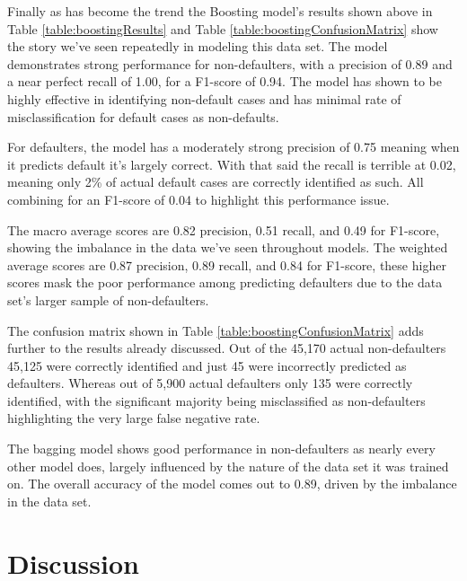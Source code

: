\documentclass[12pt]{article}
\begin{document}
Finally as has become the trend the Boosting model's results shown above in Table \ref{table:boostingResults} and Table \ref{table:boostingConfusionMatrix} show the story we've seen repeatedly in modeling this data set. The model demonstrates strong performance for non-defaulters, with a precision of 0.89 and a near perfect recall of 1.00, for a F1-score of 0.94. The model has shown to be highly effective in identifying non-default cases and has minimal rate of misclassification for default cases as non-defaults.

For defaulters, the model has a moderately strong precision of 0.75 meaning when it predicts default it's largely correct. With that said the recall is terrible at 0.02, meaning only 2\% of actual default cases are correctly identified as such. All combining for an F1-score of 0.04 to highlight this performance issue.

The macro average scores are 0.82 precision, 0.51 recall, and 0.49 for F1-score, showing the imbalance in the data we've seen throughout models. The weighted average scores are 0.87 precision, 0.89 recall, and 0.84 for F1-score, these higher scores mask the poor performance among predicting defaulters due to the data set's larger sample of non-defaulters.

The confusion matrix shown in Table \ref{table:boostingConfusionMatrix} adds further to the results already discussed. Out of the 45,170 actual non-defaulters 45,125 were correctly identified and just 45 were incorrectly predicted as defaulters. Whereas out of 5,900 actual defaulters only 135 were correctly identified, with the significant majority being misclassified as non-defaulters highlighting the very large false negative rate.

The bagging model shows good performance in non-defaulters as nearly every other model does, largely influenced by the nature of the data set it was trained on. The overall accuracy of the model comes out to 0.89, driven by the imbalance in the data set.

\section{Discussion}
\label{sec:disc}
\end{document}
